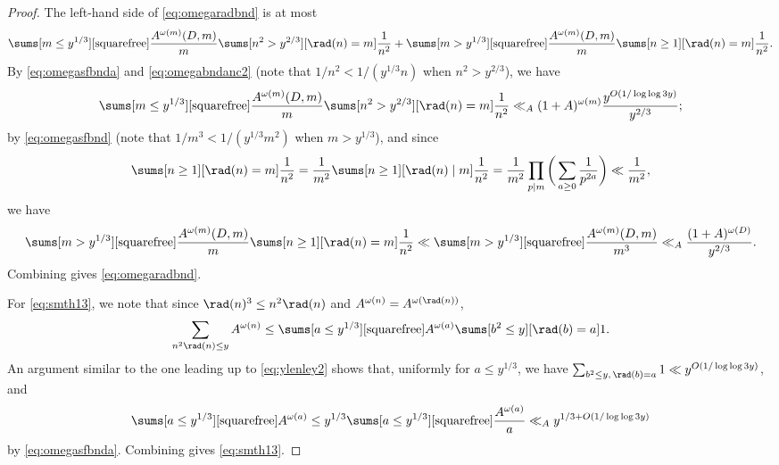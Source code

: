\documentclass[12pt, reqno, twoside, letterpaper]{amsart}
\begin{document}
\begin{proof}
The left-hand side of \eqref{eq:omegaradbnd} is at most
\[
     \sums[m \le y^{1/3}][\text{squarefree}] %
      \frac{A^{\omega(m)}(D,m)}{m}
       \sums[n^2 > y^{2/3}][\rad(n) = m]
        \frac{1}{n^2}
       +
         \sums[m > y^{1/3}][\text{squarefree}]%
          \frac{A^{\omega(m)}(D,m)}{m}
           \sums[n \ge 1][\rad(n) = m] \frac{1}{n^2}.
\]
%
By \eqref{eq:omegasfbnda} and \eqref{eq:omegabndanc2} (note that 
$1/n^2 < 1/(y^{1/3}n)$ when $n^2 > y^{2/3}$), we have 
\[
  \sums[m \le y^{1/3}][\text{squarefree}] %
   \frac{A^{\omega(m)}(D,m)}{m}
    \sums[n^2 > y^{2/3}][\rad(n) = m]
     \frac{1}{n^2}
      \ll_A
       (1 + A)^{\omega(m)}
        \frac{y^{O(1/\log\log 3y)}}{y^{2/3}};
\]
by \eqref{eq:omegasfbnd} (note that $1/m^3 < 1/(y^{1/3}m^2)$ when 
$m > y^{1/3}$), and since 
\[
  \sums[n \ge 1][\rad(n) = m] \frac{1}{n^2} 
   =
    \frac{1}{m^2}
     \sums[n \ge 1][\rad(n) \mid m] \frac{1}{n^2}
      =
       \frac{1}{m^2}
        \prod_{p \mid m}
         \bigg(\sum_{a \ge 0} \frac{1}{p^{2a}}\bigg)
          \ll
           \frac{1}{m^2},
\]
we have           
\[
  \sums[m > y^{1/3}][\text{squarefree}] %
   \frac{A^{\omega(m)}(D,m)}{m}
    \sums[n \ge 1][\rad(n) = m] \frac{1}{n^2}
     \ll
      \sums[m > y^{1/3}][\text{squarefree}] %
       \frac{A^{\omega(m)}(D,m)}{m^3}
        \ll_A
         \frac{(1 + A)^{\omega(D)}}{y^{2/3}}.
\]
%
Combining gives \eqref{eq:omegaradbnd}.

For \eqref{eq:smth13}, we note that since 
$\rad(n)^3 \le n^2\rad(n)$ and 
$A^{\omega(n)} = A^{\omega(\rad(n))}$, 
\[
 \sum_{n^2\rad(n) \le y} 
  A^{\omega(n)} 
   \le 
    \sums[a \le y^{1/3}][\text{squarefree}] %
     A^{\omega(a)}
     \sums[b^2 \le y][\rad(b) = a] 1.
\]
%
An argument similar to the one leading up to \eqref{eq:ylenley2} 
shows that, uniformly for $a \le y^{1/3}$, we have 
$\sum_{b^2 \le y, \, \rad(b) = a} 1 \ll y^{O(1/\log\log 3y)}$, and 
\[
 \sums[a \le y^{1/3}][\text{squarefree}] %
  A^{\omega(a)} 
  \le 
   y^{1/3}
    \sums[a \le y^{1/3}][\text{squarefree}] %
     \frac{A^{\omega(a)}}{a}
     \ll_A
      y^{1/3 + O(1/\log\log 3y)}
\]
by \eqref{eq:omegasfbnda}.
%
Combining gives \eqref{eq:smth13}.
\end{proof}
\end{document}
